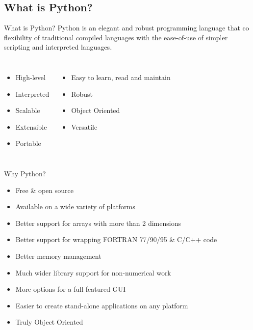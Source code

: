 \documentclass{beamer}
\begin{document}
\subsection[What is Python?]{What is Python?}
\begin{frame}{What is Python?}
Python is an elegant and robust programming language that co	 flexibility of traditional compiled languages with the ease-of-use of simpler scripting and interpreted languages.
\begin{columns}
\column[t]{5.5cm}
\begin{itemize}
\item High-level 
\item Interpreted 
\item Scalable 
\item Extensible 
\item Portable 
\end{itemize}
\column[t]{5.5cm}
\begin{itemize}
\item Easy to learn, read and maintain 
\item Robust
\item Object Oriented 
\item Versatile
\end{itemize}
\end{columns}
\end{frame}

\begin{frame}{Why Python?}
\begin{itemize} 
\item Free \& open source
\item Available on a wide variety of platforms 
\item Better support for arrays with more than 2 dimensions 
\item Better support for wrapping FORTRAN 77/90/95 \& C/C++ code
\item Better memory management 
\item Much wider library support for non-numerical work 
\item More options for a full featured GUI
\item Easier to create stand-alone applications on any platform
\item Truly Object Oriented
\end{itemize}
\end{frame}
\end{document}
